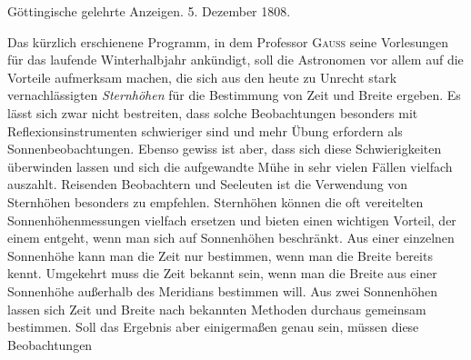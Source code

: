 \clearpage
{}%
\begin{center}\small Göttingische gelehrte Anzeigen. 5. Dezember 1808.\end{center}
\medskip
\enlargethispage{-9\baselineskip}
Das kürzlich erschienene Programm, in dem Professor \textsc{Gauß} seine Vorlesungen für das laufende Winterhalbjahr ankündigt, soll die Astronomen vor allem auf die Vorteile aufmerksam machen, die sich aus den heute zu Unrecht stark vernachlässigten \textit{Sternhöhen} für die Bestimmung von Zeit und Breite ergeben. Es lässt sich zwar nicht bestreiten, dass solche Beobachtungen besonders mit Reflexionsinstrumenten schwieriger sind und mehr Übung erfordern als Sonnenbeobachtungen. Ebenso gewiss ist aber, dass sich diese Schwierigkeiten überwinden lassen und sich die aufgewandte Mühe in sehr vielen Fällen vielfach auszahlt. Reisenden Beobachtern und Seeleuten ist die Verwendung von Sternhöhen besonders zu empfehlen. Sternhöhen können die oft vereitelten Sonnenhöhenmessungen vielfach ersetzen und bieten einen wichtigen Vorteil, der einem entgeht, wenn man sich auf Sonnenhöhen beschränkt. Aus einer einzelnen Sonnenhöhe kann man die Zeit nur bestimmen, wenn man die Breite bereits kennt. Umgekehrt muss die Zeit bekannt sein, wenn man die Breite aus einer Sonnenhöhe außerhalb des Meridians bestimmen will. Aus zwei Sonnenhöhen lassen sich Zeit und Breite nach bekannten Methoden durchaus gemeinsam bestimmen. Soll das Ergebnis aber einigermaßen genau sein, müssen diese Beobachtungen
%
